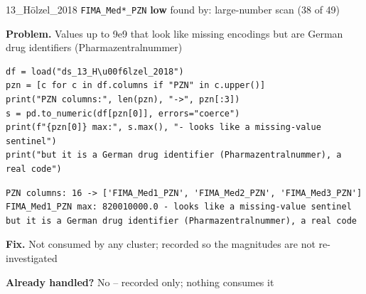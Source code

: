 \documentclass[9pt, t, handout]{beamer}
\newcommand{\ans}[1]{\textcolor{structure.fg}{#1}}
\begin{document}
\begin{frame}[fragile]{13\_Hölzel\_2018 \quad \texttt{FIMA\_Med*\_PZN}}
  {\scriptsize\textcolor{black!55}{\textbf{low}} \quad
   found by: large-number scan \quad (38 of 49)}
  \vspace{3pt}

  {\footnotesize \textbf{Problem.} Values up to 9e9 that look like missing encodings but are German drug identifiers (Pharmazentralnummer)}
  \vspace{4pt}

  \begin{Verbatim}[fontsize=\tiny, frame=single, framesep=2pt, label=\tiny reproduce]
df = load("ds_13_H\u00f6lzel_2018")
pzn = [c for c in df.columns if "PZN" in c.upper()]
print("PZN columns:", len(pzn), "->", pzn[:3])
s = pd.to_numeric(df[pzn[0]], errors="coerce")
print(f"{pzn[0]} max:", s.max(), "- looks like a missing-value sentinel")
print("but it is a German drug identifier (Pharmazentralnummer), a real code")
  \end{Verbatim}
  \begin{Verbatim}[fontsize=\tiny, frame=single, framesep=2pt, label=\tiny output]
PZN columns: 16 -> ['FIMA_Med1_PZN', 'FIMA_Med2_PZN', 'FIMA_Med3_PZN']
FIMA_Med1_PZN max: 820010000.0 - looks like a missing-value sentinel
but it is a German drug identifier (Pharmazentralnummer), a real code
  \end{Verbatim}
  \vspace{2pt}

  {\footnotesize \textbf{Fix.} Not consumed by any cluster; recorded so the magnitudes are not re-investigated}
  \vspace{2pt}

  {\footnotesize \textbf{Already handled?} \ans{No} -- recorded only; nothing consumes it
   }
\end{frame}
\end{document}
